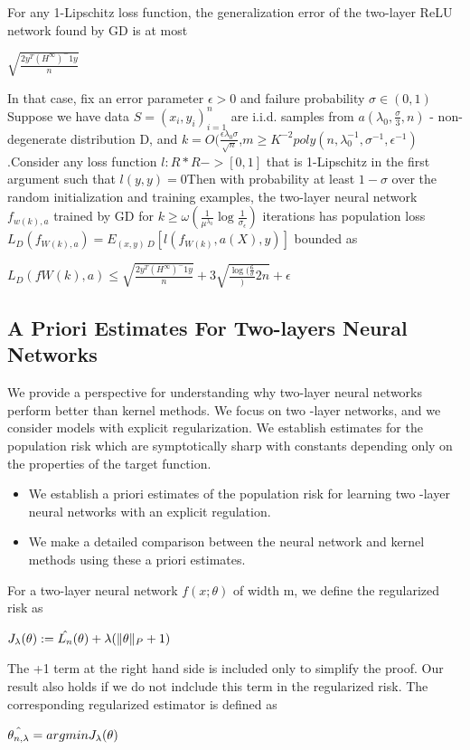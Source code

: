 \documentclass{article}
\begin{document}
For any 1-Lipschitz loss function, the generalization error of the two-layer ReLU network found by GD is at most 
\begin{center}
  $\sqrt{\frac{2y^T(H^\infty)^-1y}{n}}$
\end{center}
In that case, fix an error parameter $\epsilon > 0$ and failure probability $\sigma \in (0,1)$ Suppose we have data $S={(x_i,y_i)}_{i=1}^n$ are i.i.d. samples from $a (\lambda_0,\frac{\sigma}{3},n)$ - non-degenerate distribution D, and $k = O(\frac{\epsilon\lambda_0\sigma}{\sqrt{n}}$,$m \geq K^{-2}poly(n,\lambda_0^{-1},\sigma^{-1},\epsilon^{-1})$.Consider any loss function $l:R*R ->[0,1]$ that is 1-Lipschitz in the first argument such that $l(y,y)=0 $Then with probability at least $1-\sigma$ over the random initialization and training examples, the two-layer neural network $f_{w(k),a}$ trained by GD for $k\geq\omega(\frac{1}{\mu^{\lambda_0}}\log{\frac{1}{\sigma_\epsilon}})$ iterations has population loss $L_D(f_{W(k),a})= E_{(x,y)~D}[l(f_{W(k)},a(X),y)]$ bounded as
\begin{center}
    $L_D(f{W(k),a})\leq \sqrt{\frac{2y^T(H^\infty)^-1y}{n}} +3\sqrt{\frac{\log(\frac{6}{\sigma}}){2n}}+\epsilon$
\end{center}
\subsection{A Priori Estimates For Two-layers Neural Networks}
We provide a perspective for understanding why two-layer neural networks perform better than kernel methods. We focus on two -layer networks, and we consider models with explicit regularization. We establish estimates for the population risk which are symptotically sharp with constants depending only on the properties of the target function. 
\begin{itemize}
\item We establish a priori estimates of the population risk for learning two -layer neural networks with an explicit regulation. 
\item We make a detailed comparison between the neural network and kernel methods using these a priori estimates. 
\end{itemize}

For a two-layer neural network $f(x;\theta)$ of width m, we define the regularized risk as 
\begin{center}
  ${\MakeUppercase{J}_\lambda}(\theta) : = \hat{\MakeUppercase{L}_n}(\theta)+ \lambda(\|\theta\|_P+1)$
\end{center}
The +1 term at the right hand side is included only to simplify the proof. Our result also holds if we do not indclude this term in  the regularized risk. The corresponding regularized estimator is defined as 
\begin{center}
  $\hat{\theta_{n,\lambda}} = argmin{{\MakeUppercase{J}_\lambda}(\theta)}$
\end{center}
\end{document}
